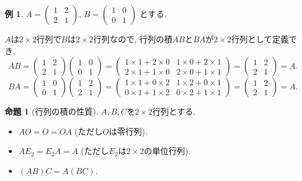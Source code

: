 \documentclass[dvipdfmx,a4paper,11pt]{article}
\theoremstyle{definition}
\newtheorem{prop}[thm]{命題}
\newtheorem{exa}[thm]{例}
\begin{document}
  \begin{exa}
  $ A= 
 \begin{pmatrix}
1& 2\\
2 & 1
 \end{pmatrix}
 $, $
 B = 
 \begin{pmatrix}
1 & 0\\
0 & 1
 \end{pmatrix}
 $
 とする. 
 
 $A$は$2\times 2$行列で$B$は$2 \times 2$行列なので, 行列の積$AB$と$BA$が$2 \times 2$行列として定義でき, 
 $$
 AB = 
 \begin{pmatrix}
1& 2\\
2 & 1
 \end{pmatrix}
 \begin{pmatrix}
1 & 0\\
0 & 1
 \end{pmatrix}
 =  
 \begin{pmatrix}
1 \times 1 + 2 \times 0& 1 \times 0 + 2 \times 1\\
2 \times 1 + 1 \times 0 & 2\times 0 + 1 \times 1
 \end{pmatrix}
 = 
 \begin{pmatrix}
1& 2\\
2 & 1
 \end{pmatrix}
 =A.
 $$
  $$
 BA = 
 \begin{pmatrix}
1 & 0\\
0 & 1
 \end{pmatrix}
 \begin{pmatrix}
1& 2\\
2 & 1
 \end{pmatrix}
 =  
 \begin{pmatrix}
1 \times 1 + 0 \times 2& 1 \times 2 + 0 \times 1\\
0 \times 1 + 1 \times 2 & 0\times 2 + 1 \times 1
 \end{pmatrix}
 = 
 \begin{pmatrix}
1& 2\\
2 & 1
 \end{pmatrix}
  =A.
 $$
 
 \end{exa}

 
 \begin{tcolorbox}[
    colback = white,
    colframe = green!35!black,
    fonttitle = \bfseries,
    breakable = true]
    \begin{prop}[行列の積の性質]
$A,B,C$を$2\times 2$行列とする.
 \begin{itemize}
 	\setlength{\parskip}{0cm}
  	\setlength{\itemsep}{0pt}
 \item $AO =O = OA$ (ただし$O$は零行列).
  \item $AE_{2}=E_{2}A =A$ (ただし$E_2$は$2 \times 2$の単位行列). 
  \item $(AB)C = A(BC)$.　
 \end{itemize}
  \end{prop}
 \end{tcolorbox}
\end{document}
